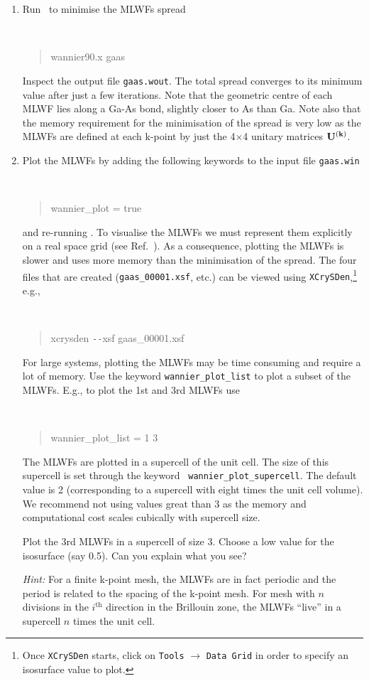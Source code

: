 \documentclass[a4paper,11pt,twoside]{article}
\begin{document}
\begin{enumerate}
\item Run \wannier\ to minimise the MLWFs spread
{\tt
\begin{quote}
wannier90.x gaas
\end{quote} }
Inspect the output file {\tt gaas.wout}. The total spread converges to its
minimum value after just a few iterations. Note that the geometric centre of
each MLWF lies along a Ga-As bond, slightly closer to As
than Ga. Note also that the memory requirement for the minimisation of
the spread is very low as the MLWFs are defined at each
k-point by just the 4$\times$4 unitary matrices $\mathbf{U}^{(\mathbf{k})}$. 
\item Plot the MLWFs by adding the following keywords to
  the input file {\tt gaas.win} 
{\tt
\begin{quote}
wannier\_\-plot = true
\end{quote} } and re-running \wannier. To visualise the MLWFs we must
represent them explicitly on a real space grid (see
Ref.~\cite{UserGuide}). As a consequence, plotting the MLWFs is slower
and uses more memory than the minimisation of the spread. The four
files that are created ({\tt gaas\_00001.xsf}, etc.) can be viewed
using {\tt XCrySDen},\footnote{Once {\tt XCrySDen} starts, click on
  {\tt Tools} $\rightarrow$ {\tt Data Grid} in order to specify an
  isosurface value to plot.} e.g., {\tt
\begin{quote}
xcrysden \texttt{-{}-}xsf gaas\_00001.xsf
\end{quote} }

For large systems, plotting the MLWFs may be time consuming
and require a lot of memory. Use the keyword {\tt wannier\_plot\_list}
to plot a subset of the MLWFs. E.g., to plot the
1st and 3rd MLWFs use 
{\tt
\begin{quote}
wannier\_plot\_list = 1 3
\end{quote} }
The MLWFs are plotted in a supercell of the unit cell. The
size of this supercell is set through the keyword {\tt
  wannier\_plot\_supercell}. The default value is 2 (corresponding to a
supercell with eight times the unit cell volume). We recommend not using
values great than 3 as the memory and computational cost scales
cubically with supercell size.  

Plot the 3rd MLWFs in a supercell of size 3. Choose a low
value for the isosurface (say 0.5). Can you explain what you see? 

{\it Hint:} For a finite k-point mesh, the MLWFs are in fact
periodic and the period is related to the spacing of the k-point mesh. For
mesh with $n$ divisions in the $i^{\mathrm{th}}$ direction in the
Brillouin zone, the MLWFs ``live'' in a supercell $n$ times the
unit cell. 
\end{enumerate}
\end{document}
